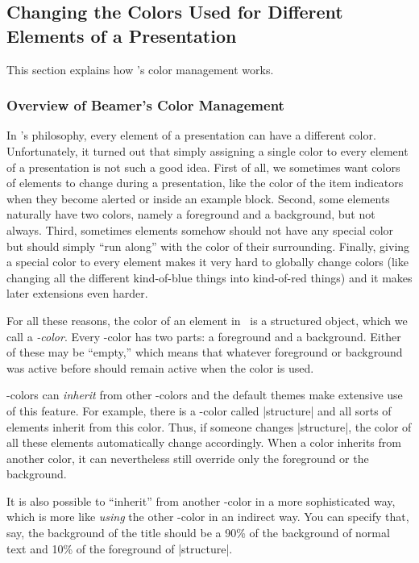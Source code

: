 \subsection{Changing the Colors Used for Different Elements of a Presentation}

This section explains how \beamer's color management works.

\subsubsection{Overview of Beamer's Color Management}

In \beamer's philosophy, every element of a presentation can have a different color. Unfortunately, it turned out that simply assigning a single color to every element of a presentation is not such a good idea. First of all, we sometimes want colors of elements to change during a presentation, like the color of the item indicators when they become alerted or inside an example block. Second, some elements naturally have two colors, namely a foreground and a background, but not always. Third, sometimes elements somehow should not have any special color but should simply ``run along'' with the color of their surrounding. Finally, giving a special color to every element makes it very hard to globally change colors (like changing all the different kind-of-blue things into kind-of-red things) and it makes later extensions even harder.

For all these reasons, the color of an element in \beamer\ is a structured object, which we call a \emph{\beamer-color}. Every \beamer-color has two parts: a foreground and a background. Either of these may be ``empty,'' which means that whatever foreground or background was active before should remain active when the color is used.

\beamer-colors can \emph{inherit} from other \beamer-colors and the default themes make extensive use of this feature. For example, there is a \beamer-color called |structure| and all sorts of elements inherit from this color. Thus, if someone changes |structure|, the color of all these elements automatically change accordingly. When a color inherits from another color, it can nevertheless still override only the foreground or the background.

It is also possible to ``inherit'' from another \beamer-color in a more sophisticated way, which is more like \emph{using} the other \beamer-color in an indirect way. You can specify that, say, the background of the title should be a 90\% of the background of normal text and 10\% of the foreground of |structure|.

